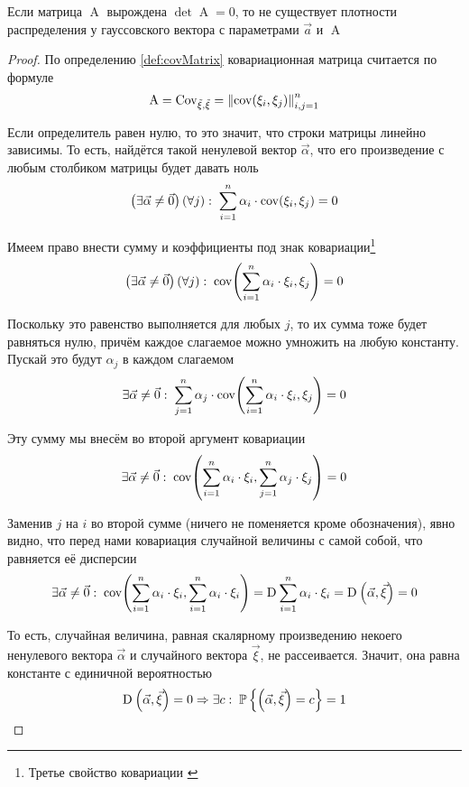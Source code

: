 \begin{affirmation}
    Если матрица $\operatorname{A}$ вырождена $\det\operatorname{A} = 0$, то не
    существует плотности распределения у гауссовского вектора с параметрами
    $\vec{a}$ и $\operatorname{A}$
\end{affirmation}
\begin{proof}
    По определению \ref{def:covMatrix} ковариационная матрица считается по
    формуле
    $$\operatorname{A}
        = \operatorname{Cov_{\vec{\xi}, \vec{\xi}}}
        = \left\| \operatorname{cov}\!\left( \xi_i, \xi_j \right) \right\|_{i,j=1}^n$$

    Если определитель равен нулю, то это значит, что строки матрицы линейно
    зависимы. То есть, найдётся такой ненулевой вектор $\vec{\alpha}$, что
    его произведение с любым столбиком матрицы будет давать ноль
    $$\left( \exists \vec{\alpha} \neq \vec{0} \right) \left( \forall j \right):
        \;\sum_{i=1}^{n} \alpha_i \cdot \operatorname{cov}\!\left( \xi_i, \xi_j \right) = 0$$

    Имеем право внести сумму и коэффициенты под знак ковариации\footnote{Третье
    свойство ковариации \cite[с.~310]{MGTUXVI}}
    $$\left( \exists \vec{\alpha} \neq \vec{0} \right) \left( \forall j \right):
        \;\operatorname{cov}\!\left( \sum_{i=1}^{n} \alpha_i \cdot \xi_i, \xi_j \right) = 0$$

    Поскольку это равенство выполняется для любых $j$, то их сумма тоже будет
    равняться нулю, причём каждое слагаемое можно умножить на любую константу.
    Пускай это будут $\alpha_j$ в каждом слагаемом
    $$\exists \vec{\alpha} \neq \vec{0}:\; \sum_{j=1}^{n} \alpha_j
            \cdot \operatorname{cov}\!\left( \sum_{i=1}^{n} \alpha_i \cdot \xi_i, \xi_j \right) = 0$$

    Эту сумму мы внесём во второй аргумент ковариации
    $$\exists \vec{\alpha} \neq \vec{0}:\;
        \operatorname{cov}\!\left( \sum_{i=1}^{n} \alpha_i \cdot \xi_i,
            \sum_{j=1}^{n} \alpha_j \cdot \xi_j \right) = 0$$

    Заменив $j$ на $i$ во второй сумме (ничего не поменяется кроме обозначения),
    явно видно, что перед нами ковариация случайной величины с самой собой, что
    равняется её дисперсии
    $$\exists \vec{\alpha} \neq \vec{0}:\;
        \operatorname{cov}\!\left( \sum_{i=1}^{n} \alpha_i \cdot \xi_i,
            \sum_{i=1}^{n} \alpha_i \cdot \xi_i \right)
        = \operatorname{D}_{} \sum_{i=1}^{n} \alpha_i \cdot \xi_i
        = \operatorname{D}_{} \left( \vec{\alpha}, \vec{\xi} \right)
        = 0$$

    То есть, случайная величина, равная скалярному произведению некоего
    ненулевого вектора $\vec{\alpha}$ и случайного вектора $\vec{\xi}$,
    не рассеивается. Значит, она равна константе с единичной вероятностью
    $$\operatorname{D}_{} \left( \vec{\alpha}, \vec{\xi} \right) = 0
        \Rightarrow \exists c:\;
        \mathbb{P}\left\{ \left( \vec{\alpha}, \vec{\xi} \right) = c \right\} = 1$$


\end{proof}

